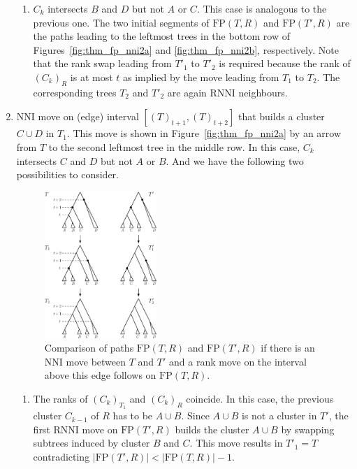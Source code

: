 \documentclass[11pt]{amsart}
\newcommand{\rnni}{\mathrm{RNNI}}
\newcommand{\nni}{\mathrm{NNI}}
\newcommand{\fp}{\mathrm{FP}}
\begin{document}
\begin{enumerate}[label = 1.{\arabic*}]
\begin{enumerate}[label = \theenumi.\arabic*]
\item $C_k$ intersects $B$ and $D$ but not $A$ or $C$.
This case is analogous to the previous one.
The two initial segments of $\fp(T, R)$ and $\fp(T', R)$ are the paths leading to the leftmost trees in the bottom row of Figures~\ref{fig:thm_fp_nni2a} and \ref{fig:thm_fp_nni2b}, respectively.
Note that the rank swap leading from $T'_1$ to $T'_2$ is required because the rank of $(C_k)_R$ is at most $t$ as implied by the move leading from $T_1$ to $T_2$.
The corresponding trees $T_2$ and $T'_2$ are again $\rnni$ neighbours.
\end{enumerate}

\item $\nni$ move on (edge) interval $[(T)_{t+1}, (T)_{t+2}]$ that builds a cluster $C \cup D$ in $T_1$.
\label{case:one_or_two_moves_down}
This move is shown in Figure~\ref{fig:thm_fp_nni2a} by an arrow from $T$ to the second leftmost tree in the middle row.
In this case, $C_k$ intersects $C$ and $D$ but not $A$ or $B$.
And we have the following two possibilities to consider.

\begin{figure}[ht]
	\centering
	\includegraphics[width=0.4\textwidth]{thm_fp_nni3}
	\caption{Comparison of paths $\fp(T, R)$ and $\fp(T', R)$ if there is an $\nni$ move between $T$ and $T'$ and a rank move on the interval above this edge follows on $\fp(T, R)$.}
	\label{fig:thm_fp_nni3}
\end{figure}

\begin{enumerate}[label = \theenumi.\arabic*]
\item The ranks of $(C_k)_{T_1}$ and $(C_k)_R$ coincide.
In this case, the previous cluster $C_{k-1}$ of $R$ has to be $A \cup B$.
Since $A \cup B$ is not a cluster in $T'$, the first $\rnni$ move on $\fp(T', R)$ builds the cluster $A \cup B$ by swapping subtrees induced by cluster $B$ and $C$.
This move results in $T'_1 = T$ contradicting $|\fp(T',R)| < |\fp(T,R)| - 1$.


\end{enumerate}
\end{enumerate}
\end{document}
